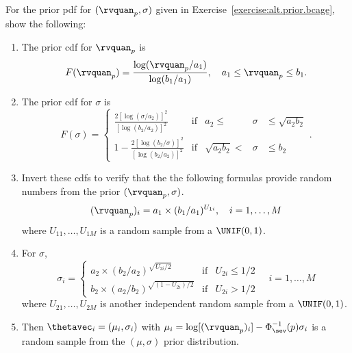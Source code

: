 \begin{exercise1}
For the prior pdf for $(\rvquan_{p}, \sigma)$ 
given in Exercise~\ref{exercise:alt.prior.bcage}, show the following:
\begin{enumerate}
\item
The prior cdf for $\rvquan_{p}$ is
\begin{displaymath}
F(\rvquan_{p})=\frac{\log(\rvquan_{p}/a_{1})}{\log(b_{1}/a_{1})}, \quad 
a_{1} \le \rvquan_{p} \le b_{1}.
\end{displaymath}
\item
The prior cdf for $\sigma$ is
\begin{displaymath}
F(\sigma)=
\left \{
\begin{array}{lcrcl}
\frac{2[\log(\sigma/a_{2})]^{2}}
     { [\log(b_{2}/a_{2})]^{2}}& \mbox{if}& a_{2} \le& \sigma &\le \sqrt{a_{2} b_{2}}
\\[1em]
1-\frac{2[\log(b_{2}/\sigma)]^{2}}
     {[\log(b_{2}/a_{2})]^{2}}& \mbox{if}& \sqrt{a_{2} b_{2}} < & \sigma &\le  b_{2}
\end{array}.
\right.
\end{displaymath}\item
Invert these cdfs to verify that the 
the following formulas provide 
random numbers from the prior $(\rvquan_{p},\sigma)$.
\begin{displaymath}
(\rvquan_{p})_{i}=a_{1}\times (b_{1}/a_{1})^{U_{1i}},
\quad i=1, \ldots, M
\end{displaymath}
where $U_{11}, \ldots, U_{1M}$ is a random sample
from a $\UNIF(0,1)$.
\item
For $\sigma$, 
\begin{displaymath}
\sigma_{i}=
\left \{
\begin{array}{lcl}
a_{2} \times \left (b_{2}/a_{2}\right )^{\sqrt{U_{2i}/2}}
& \mbox{if}& U_{2i} \le 1/2
\\[1em]
b_{2} \times \left (a_{2}/b_{2}\right )^{\sqrt{(1-U_{2i})/2}}
& \mbox{if}& U_{2i} > 1/2
\end{array}
\right.
\quad i=1, \ldots, M
\end{displaymath}
where $U_{21}, \ldots, U_{2M}$ is another
independent random sample
from a $\UNIF(0,1)$.
\item
Then $\thetavec_{i}=(\mu_{i}, \sigma_{i})$ with
$\mu_{i}=\log[(\rvquan_{p})_{i}]-\Phi^{-1}_{\sev}(p)\sigma_{i}$
is a random sample from the $(\mu, \sigma)$ prior distribution.
\end{enumerate}
\end{exercise1}

